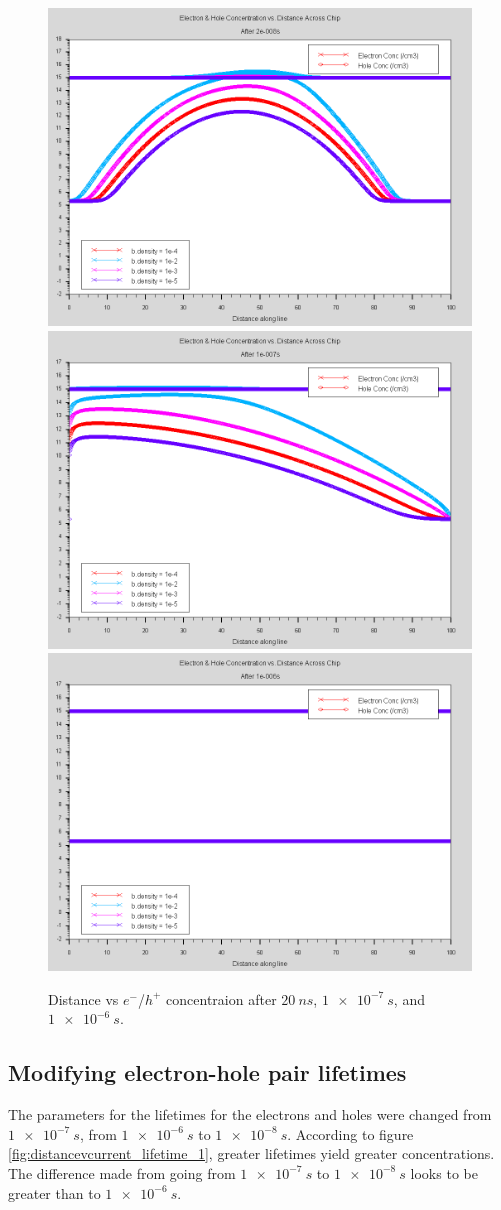 \documentclass[12pt]{article}
\begin{document}
  \begin{figure}[htp]
    \centering
    \includegraphics[width=.3\textwidth]{density_after2e-008s}\hfill
    \includegraphics[width=.3\textwidth]{density_after1e-007s}\hfill
    \includegraphics[width=.3\textwidth]{density_after1e-006s}
    \caption{Distance vs $e^-$/$h^+$ concentraion after $\SI{20}{ns}$, $\SI{1e-7}{s}$, and $\SI{1e-6}{s}$.}
    \label{fig:distancevcurrent_density}
  \end{figure}

  \subsection{Modifying electron-hole pair lifetimes}
  The parameters for the lifetimes for the electrons and holes were changed from $\SI{1e-7}{s}$, from $\SI{1e-6}{s}$ to $\SI{1e-8}{s}$. According to figure \ref{fig:distancevcurrent_lifetime_1}, greater lifetimes yield greater concentrations. The difference made from going from $\SI{1e-7}{s}$ to $\SI{1e-8}{s}$ looks to be greater than to $\SI{1e-6}{s}$.
\end{document}
